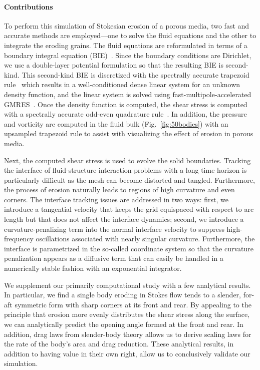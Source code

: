 \documentclass[preprint, 10pt]{elsarticle}
\begin{document}
\paragraph{Contributions}
To perform this simulation of Stokesian erosion of a porous media, two
fast and accurate methods are employed---one to solve the fluid
equations and the other to integrate the eroding grains.  The fluid
equations are reformulated in terms of a boundary integral equation
(BIE)~\cite{poz1992}.  Since the boundary conditions are Dirichlet, we
use a double-layer potential formulation so that the resulting BIE is
second-kind.  This second-kind BIE is discretized with the spectrally
accurate trapezoid rule~\cite{tre-wei2014} which results in a
well-conditioned dense linear system for an unknown density function,
and the linear system is solved using fast-multipole-accelerated
GMRES~\cite{saa-sch1986}.  Once the density function is computed, the
shear stress is computed with a spectrally accurate
odd-even quadrature rule~\cite{sid-isr1988}.  In addition, the pressure
and vorticity are computed in the fluid bulk (Fig.~\ref{fig:50bodies})
with an upsampled trapezoid rule to assist with visualizing the effect of erosion in porous media.

Next, the computed shear stress is used to evolve the solid boundaries.
Tracking the interface of fluid-structure interaction problems with a long time horizon is particularly
difficult as the mesh can become distorted and tangled. 
Furthermore, the process of erosion naturally leads to regions of high curvature and even corners.
The interface tracking issues are addressed in two ways: first, we introduce a tangential velocity that keeps the grid equispaced with respect to arc length but that does not affect the interface dynamics; second, we introduce a curvature-penalizing term into the normal interface velocity to suppress high-frequency oscillations associated with nearly singular curvature.
Furthermore, the interface is parametrized in the so-called {\thL} coordinate system so that the curvature penalization appears as a diffusive term that can easily be handled in a numerically stable fashion with an exponential integrator.

We supplement our primarily computational study with a few analytical results. In particular, we find a single body eroding in Stokes flow tends to a slender, for-aft symmetric form with sharp corners at its front and rear. By appealing to the principle that erosion more evenly distributes the shear stress along the surface, we can analytically predict the opening angle formed at the front and rear. In addition, drag laws from slender-body theory allows us to derive scaling laws for the rate of the body's area and drag reduction. These analytical results, in addition to having value in their own right, allow us to conclusively validate our simulation. 
\end{document}
